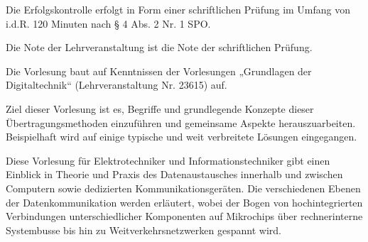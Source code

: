 \begin{course}

\setdoclanguagegerman
{}



\coursehead


\label{cour_8099.dp_997}


\begin{styleenv}
\begin{assessment}
Die Erfolgskontrolle erfolgt in Form einer schriftlichen Prüfung im Umfang von i.d.R. 120 Minuten nach § 4 Abs. 2 Nr. 1 SPO.

 

Die Note der Lehrveranstaltung ist die Note der schriftlichen Prüfung.


\end{assessment}

\begin{conditions}Die Vorlesung baut auf Kenntnissen der Vorlesungen „Grundlagen der Digitaltechnik“ (Lehrveranstaltung Nr. 23615) auf.

\end{conditions}


\end{styleenv}

\begin{learningoutcomes}
Ziel dieser Vorlesung ist es, Begriffe und grundlegende Konzepte dieser Übertragungsmethoden einzuführen und gemeinsame Aspekte herauszuarbeiten. Beispielhaft wird auf einige typische und weit verbreitete Lösungen eingegangen.


\end{learningoutcomes}

\begin{content}
Diese Vorlesung für Elektrotechniker und Informationstechniker gibt einen Einblick in Theorie und Praxis des Datenaustausches innerhalb und zwischen Computern sowie dedizierten Kommunikationsgeräten. Die verschiedenen Ebenen der Datenkommunikation werden erläutert, wobei der Bogen von hochintegrierten Verbindungen unterschiedlicher Komponenten auf Mikrochips über rechnerinterne Systembusse bis hin zu Weitverkehrsnetzwerken gespannt wird.


\end{content}
\end{course}
